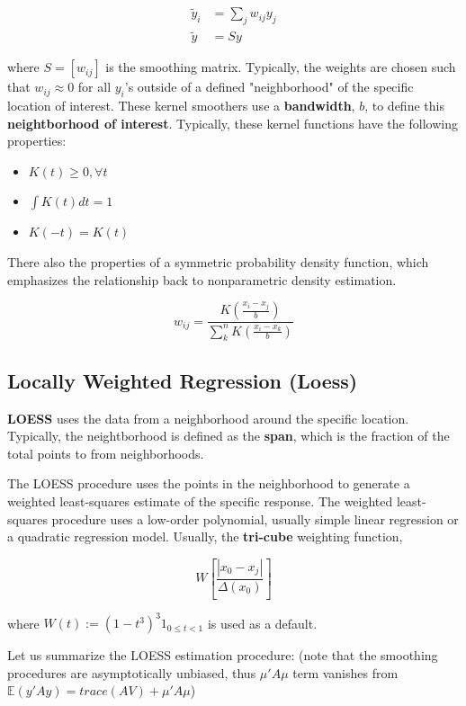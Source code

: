 \documentclass[12pt]{article}
\begin{document}
$$
\begin{aligned}
\tilde{y}_i &= \sum_j w_{ij} y_j \\[10pt]
\tilde{y} &= Sy
\end{aligned}
$$

where $S = [w_{ij}]$ is the smoothing matrix. Typically, the weights are chosen such that $w_{ij} \approx 0$ for all $y_i$'s outside of a defined "neighborhood" of the specific location of interest. These kernel smoothers use a \textbf{bandwidth}, $b$, to define this \textbf{neightborhood of interest}. Typically, these kernel functions have the following properties:

\begin{itemize}
	\item $K(t) \ge 0, \forall t$
	\item $\int K(t)dt = 1$
	\item $K(-t) = K(t)$
\end{itemize}

There also the properties of a symmetric probability density function, which emphasizes the relationship back to nonparametric density estimation. 

$$
w_{ij} = \frac{ K \left( \frac{x_i - x_j}{b} \right) }{ \sum_k^n K\left( \frac{x_i - x_k}{b} \right)}
$$


\subsection{Locally Weighted Regression (Loess)}

\textbf{LOESS} uses the data from a neighborhood around the specific location. Typically, the neightborhood is defined as the \textbf{span}, which is the fraction of the total points to from neighborhoods.

The LOESS procedure uses the points in the neighborhood to generate a weighted least-squares estimate of the specific response. The weighted least-squares procedure uses a low-order polynomial, usually simple linear regression or a quadratic regression model. Usually, the \textbf{tri-cube} weighting function,

$$
W \left[ \frac{|x_0 - x_j| }{\Delta (x_0)} \right]
$$

where $W(t) := (1-t^3)^3 1_{0 \le t <1}$ is used as a default.

Let us summarize the LOESS estimation procedure: (note that the smoothing procedures are asymptotically unbiased, thus $\mu'A\mu$ term vanishes from $\mathbb{E}(y'Ay) = trace(AV) + \mu'A\mu$)
\end{document}
